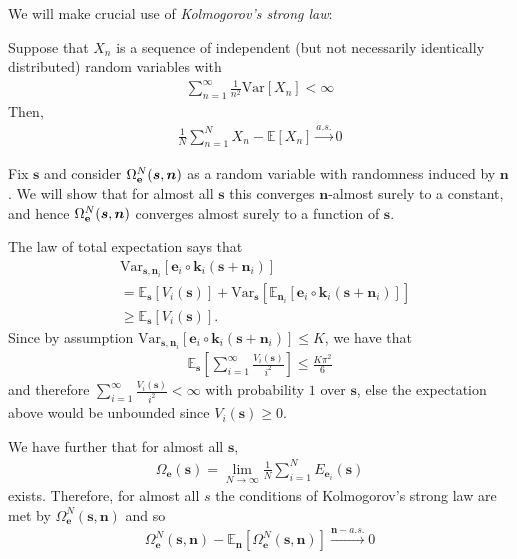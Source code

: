 \documentclass[letterpaper]{article}
\theoremstyle{definition}
\begin{document}
We will make crucial use of \emph{Kolmogorov's strong law}:
\begin{theorem}
Suppose that $X_n$ is a sequence of independent (but not necessarily identically distributed) random variables with
\begin{align*}
    \sum_{n=1}^\infty \frac{1}{n^2}\mathrm{Var} [X_n] < \infty
\end{align*}
Then,
\begin{align*}
    \frac{1}{N}\sum_{n=1}^N X_n - \mathbb{E}[X_n] \overset{a.s.}{\longrightarrow} 0
\end{align*}
\end{theorem}

Fix $\bm{s}$ and consider $\Omega_{\mathbf{e}}^N(\bm{s}, \bm{n})$ as a random variable with randomness induced by $\bm{n}$.
We will show that for almost all $\bm{s}$ this converges $\bm{n}$-almost surely to a constant, and hence $\Omega_{\mathbf{e}}^N(\bm{s}, \bm{n})$ converges almost surely to a function of $\bm{s}$.

The law of total expectation says that
\begin{align*}
    &\mathrm{Var}_{\bm{s}, \bm{n}_i} [\bm{e}_i\circ \bm{k}_i(\bm{s} + \bm{n}_i)] \\
    &= \mathbb{E}_{\bm{s}}\left[ V_i(\bm{s}) \right] + \mathrm{Var}_{\bm{s}}\left[ \mathbb{E}_{\bm{n}_i} [\bm{e}_i\circ \bm{k}_i( \bm{s} + \bm{n}_i)] \right] \\
    & \geq \mathbb{E}_{\bm{s}}\left[ V_i(\bm{s}) \right].
\end{align*}
Since by assumption $\mathrm{Var}_{\bm{s}, \bm{n}_i} [\bm{e}_i\circ \bm{k}_i(\bm{s} + \bm{n}_i)] \leq K$, we have that
\begin{align*}
    \mathbb{E}_{\bm{s}}\left[ \sum_{i=1}^\infty  \frac{V_i(\bm{s})}{i^2} \right] \leq \frac{ K \pi^2}{6}
\end{align*}
and therefore  $\sum_{i=1}^\infty  \frac{V_i(\bm{s})}{i^2} < \infty$ with probability $1$ over $\bm{s}$, else the expectation above would be unbounded since $V_i(\bm{s})\geq 0$.

We have further that for almost all $\bm{s}$,
\begin{align*}
    \Omega_{\bm{e}}(\bm{s}) = \lim_{N\to\infty}\frac{1}{N}\sum_{i=1}^N E_{\bm{e}_i}(\bm{s})
\end{align*}
exists.
Therefore, for almost all $s$ the conditions of Kolmogorov's strong law are met by $\Omega_{\bm{e}}^N(\bm{s}, \bm{n})$ and so
\begin{align*}
    \Omega_{\bm{e}}^N(\bm{s}, \bm{n}) - \mathbb{E}_{\bm{n}}[\Omega_{\bm{e}}^N(\bm{s}, \bm{n})] \overset{\bm{n}-a.s.}{\longrightarrow} 0
\end{align*}
\end{document}
